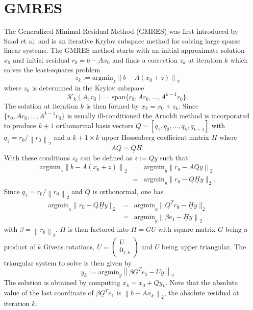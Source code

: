 \documentclass{scrartcl}
\numberwithin{equation}{section}
\newcommand{\norm}[1]{\left\lVert#1\right\rVert}
\begin{document}
\section{GMRES}
The Generalized Minimal Residual Method (GMRES) was first introduced by Saad et al. \cite{Saad:1986:GGM:14063.14074} and is an iterative Krylov subspace method for solving large sparse linear systems. 
The GMRES method starts with an initial approximate solution $x_0$ and initial residual $r_0 = b - Ax_0$ and finds a correction $z_k$ at iteration $k$ which solves the least-squares problem 
\begin{equation}
	z_k := \text{argmin}_{z} \norm{b - A(x_0 + z)}_2
\end{equation}
where $z_k$ is determined in the Krylov subspace 
\begin{equation*}
	 \mathcal{K}_k(A, r_0) = \text{span}\{r_0, Ar_0, \ldots, A^{k-1}r_0\}.
\end{equation*}
The solution at iteration $k$ is then formed by $x_k = x_0 + z_k$.
Since $\{r_0, Ar_0, \ldots, A^{k-1}r_0\}$ is usually ill-conditioned the Arnoldi method is incorporated to produce $k + 1$ orthonormal basis vectors $\underline{Q} = [q_1, q_2, \ldots, q_k, q_{k + 1}]$ with $q_1 = r_0/\norm{r_0}_2$ and a $k + 1 \times k$ upper Hessenberg coefficient matrix $\underline{H}$ where
\begin{equation*}
	AQ = \underline{Q}\underline{H}.
\end{equation*}
With these conditions $z_k$ can be defined as $z := Qy$ such that 
\begin{eqnarray*}
	\text{argmin}_{z} \norm{b - A(x_0 + z)}_2 &=& \text{argmin}_y \norm{r_0 - AQy}_2 \\
	 &=& \text{argmin}_{y} \lVert r_0 - \underline{Q} \underline{H} y \rVert_2.
\end{eqnarray*}
Since $q_1 = r_0/\norm{r_0}_2$ and $\underline{Q}$ is orthonormal, one has
\begin{eqnarray} \label{eq:stdgmreslsp}
	\text{argmin}_y \lVert r_0 - \underline{Q} \underline{H} y \rVert_2 &=& \text{argmin}_{y} \lVert \underline{Q}^T r_0 - \underline{H} y \rVert_2 \nonumber \\
	&=& \text{argmin}_{y} \norm{\beta e_1 - \underline{H} y}_2 
\end{eqnarray}
with $\beta = \norm{r_0}_2$.
$\underline{H}$ is then factored into $\underline{H} = \underline{G}\underline{U}$ with square matrix $\underline{G}$ being a product of $k$ Givens rotations, $\underline{U} = 
\begin{pmatrix}
	U \\
	0_{1, k}
\end{pmatrix}$
and $U$ being upper triangular. The triangular system to solve is then given by
\begin{equation*}
	y_k := \text{argmin}_y \norm{\beta \underline{G}^T e_1 - \underline{U} y}_2
\end{equation*}
The solution is obtained by computing $x_k = x_0 + Qy_k$. Note that the absolute value of the last coordinate of $\beta \underline{G}^T e_1$ is $\norm{b - Ax_k}_2$, the absolute residual at iteration $k$.
\end{document}
